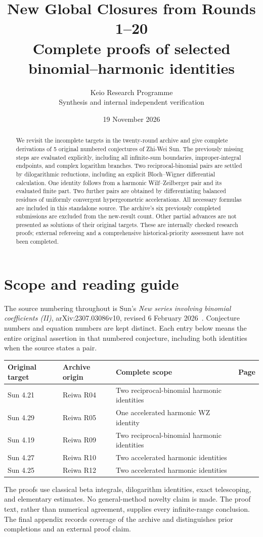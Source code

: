 \documentclass[11pt,a4paper]{article}
\title{New Global Closures from Rounds 1--20\\[5pt]
\large Complete proofs of selected binomial--harmonic identities}
\author{Keio Research Programme\\Synthesis and internal independent verification}
\date{19 November 2026}
\theoremstyle{remark}\newtheorem{remark}[theorem]{Remark}
\numberwithin{equation}{section}
\begin{document}
\maketitle
\begin{abstract}
We revisit the incomplete targets in the twenty-round archive and give
complete derivations of 5 original numbered conjectures of Zhi-Wei Sun.
The previously missing steps are evaluated explicitly, including all
infinite-sum boundaries, improper-integral endpoints, and complex logarithm
branches. Two reciprocal-binomial pairs are settled by dilogarithmic reductions,
including an explicit Bloch--Wigner differential calculation. One identity
follows from a harmonic Wilf--Zeilberger pair and its evaluated finite part.
Two further pairs are obtained by differentiating balanced residues of
uniformly convergent hypergeometric accelerations.
All necessary formulas are included in this standalone source. The archive's
six previously completed submissions are excluded from the new-result count.
Other partial advances are not presented as solutions of their original
targets. These are internally checked research proofs; external refereeing
and a comprehensive historical-priority assessment have not been completed.
\end{abstract}
\section*{Scope and reading guide}
The source numbering throughout is Sun's
\emph{New series involving binomial coefficients (II)},
arXiv:2307.03086v10, revised 6 February 2026~\cite{Sun}.
Conjecture numbers and equation numbers are kept distinct. Each entry below
means the entire original assertion in that numbered conjecture, including
both identities when the source states a pair.
\begin{center}
\begin{tabular}{@{}lllr@{}}\toprule
Original target & Archive origin & Complete scope & Page\\\midrule
Sun 4.21 & Reiwa R04 & Two reciprocal-binomial harmonic identities & \pageref{s421:thm:s421-main}\\
Sun 4.29 & Reiwa R05 & One accelerated harmonic WZ identity & \pageref{thm:sun429-complete}\\
Sun 4.19 & Reiwa R09 & Two reciprocal-binomial harmonic identities & \pageref{s419:thm:sun419-complete}\\
Sun 4.27 & Reiwa R10 & Two accelerated harmonic identities & \pageref{thm:sun427-complete}\\
Sun 4.25 & Reiwa R12 & Two accelerated harmonic identities & \pageref{thm:sun425-complete}\\
\bottomrule\end{tabular}
\end{center}
The proofs use classical beta integrals, dilogarithm identities, exact
telescoping, and elementary estimates. No general-method novelty claim is
made. The proof text, rather than numerical agreement, supplies every
infinite-range conclusion. The final appendix records coverage of the
archive and distinguishes prior completions and an external proof claim.
\clearpage
\end{document}

